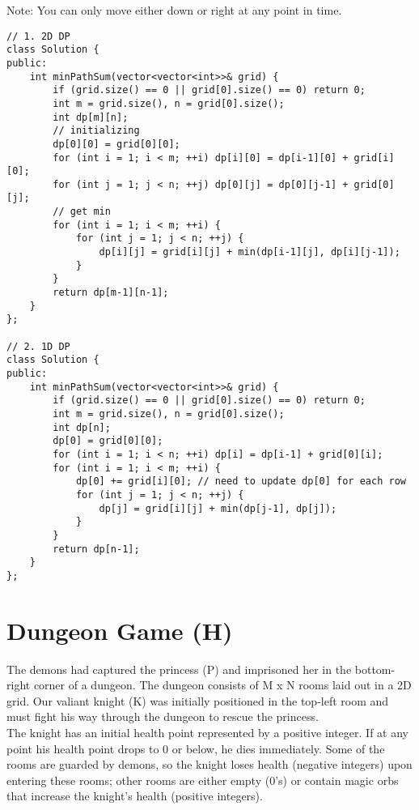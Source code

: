 Note: You can only move either down or right at any point in time.\\

\begin{lstlisting}
// 1. 2D DP
class Solution {
public:
    int minPathSum(vector<vector<int>>& grid) {
        if (grid.size() == 0 || grid[0].size() == 0) return 0;
        int m = grid.size(), n = grid[0].size();
        int dp[m][n];
        // initializing
        dp[0][0] = grid[0][0];
        for (int i = 1; i < m; ++i) dp[i][0] = dp[i-1][0] + grid[i][0];
        for (int j = 1; j < n; ++j) dp[0][j] = dp[0][j-1] + grid[0][j];
        // get min
        for (int i = 1; i < m; ++i) {
            for (int j = 1; j < n; ++j) {
                dp[i][j] = grid[i][j] + min(dp[i-1][j], dp[i][j-1]);
            }
        }    
        return dp[m-1][n-1];
    }
};

// 2. 1D DP
class Solution {
public:
    int minPathSum(vector<vector<int>>& grid) {
        if (grid.size() == 0 || grid[0].size() == 0) return 0;
        int m = grid.size(), n = grid[0].size();
        int dp[n];
        dp[0] = grid[0][0];
        for (int i = 1; i < n; ++i) dp[i] = dp[i-1] + grid[0][i];
        for (int i = 1; i < m; ++i) {
            dp[0] += grid[i][0]; // need to update dp[0] for each row
            for (int j = 1; j < n; ++j) {
                dp[j] = grid[i][j] + min(dp[j-1], dp[j]);
            }
        }
        return dp[n-1];
    }
};
\end{lstlisting}


\section{Dungeon Game (H)}
The demons had captured the princess (P) and imprisoned her in the bottom-right corner of a dungeon. The dungeon consists of M x N rooms laid out in a 2D grid. Our valiant knight (K) was initially positioned in the top-left room and must fight his way through the dungeon to rescue the princess. \\

The knight has an initial health point represented by a positive integer. If at any point his health point drops to 0 or below, he dies immediately. Some of the rooms are guarded by demons, so the knight loses health (negative integers) upon entering these rooms; other rooms are either empty (0's) or contain magic orbs that increase the knight's health (positive integers).\\

